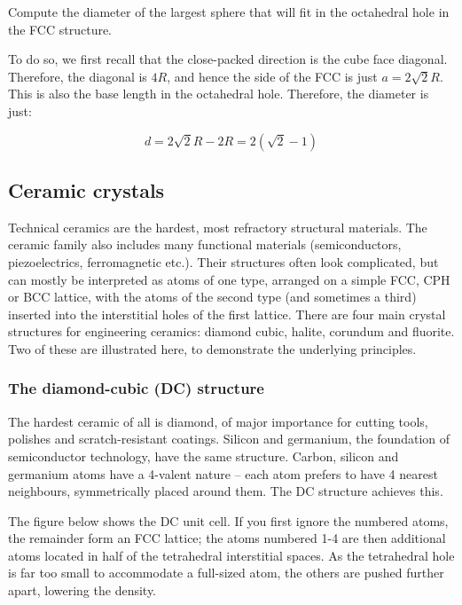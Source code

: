 \documentclass{article}
\begin{document}
\begin{example}
    Compute the diameter of the largest sphere that will fit in the octahedral hole in the FCC structure.

    To do so, we first recall that the close-packed direction is the cube face diagonal. Therefore, the diagonal is $4R$, and hence the side of the FCC is just $a = 2\sqrt{2}R$. This is also the base length in the octahedral hole. Therefore, the diameter is just:

    \[ d = 2\sqrt{2}R - 2R = 2(\sqrt{2} - 1) \]
\end{example}

\newpage

\subsection{Ceramic crystals}

Technical ceramics are the hardest, most refractory structural materials. The ceramic family also includes many functional materials (semiconductors, piezoelectrics, ferromagnetic etc.). Their structures often look complicated, but can mostly be interpreted as atoms of one type, arranged on a simple FCC, CPH or BCC lattice, with the atoms of the second type (and sometimes a third) inserted into the interstitial holes of the first lattice. There are four main crystal structures for engineering ceramics: diamond cubic, halite, corundum and fluorite. Two of these are illustrated here, to demonstrate the underlying principles.

\subsubsection{The diamond-cubic (DC) structure}

The hardest ceramic of all is diamond, of major importance for cutting tools, polishes and scratch-resistant coatings. Silicon and germanium, the foundation of semiconductor technology, have the same structure. Carbon, silicon and germanium atoms have a 4-valent nature – each atom prefers to have 4 nearest neighbours, symmetrically placed around them. The DC structure achieves this. 

The figure below shows the DC unit cell. If you first ignore the numbered atoms, the remainder form an FCC lattice; the atoms numbered 1-4 are then additional atoms located in half of the tetrahedral interstitial spaces. As the tetrahedral hole is far too small to accommodate a full-sized atom, the others are pushed further apart, lowering the density.
\end{document}
